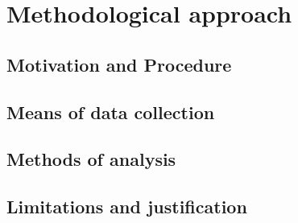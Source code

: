 \chapter{Methodological approach}

\section{Motivation and Procedure}
\section{Means of data collection}
\section{Methods of analysis}
\section{Limitations and justification}
